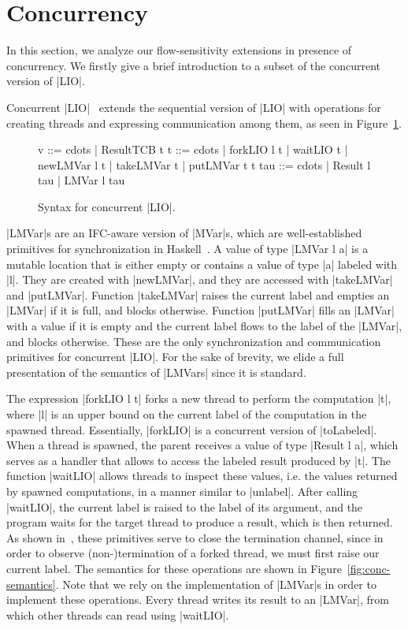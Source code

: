 \section{Concurrency}

In this section, we analyze our flow-sensitivity extensions in presence of
concurrency. We firstly give a brief introduction to a subset of the concurrent
version of |LIO|.

Concurrent |LIO|~\cite{?} extends the sequential version of |LIO| with
operations for creating threads and expressing communication among
them, as seen in Figure~\ref{fig:conc-syntax}.
\begin{figure}[ht] %
\small
\begin{code}
v    ::= cdots  | ResultTCB t 
t    ::= cdots  | forkLIO l t | waitLIO t
                | newLMVar l t | takeLMVar t | putLMVar t t
tau  ::= cdots  | Result l tau | LMVar l tau
\end{code}
\caption{Syntax for concurrent |LIO|.\label{fig:conc-syntax}}
\end{figure}

|LMVar|s are an IFC-aware version of |MVar|s, which are
well-established primitives for synchronization in
Haskell~\cite{CH96}.  A value of type |LMVar l a| is a mutable
location that is either empty or contains a value of type |a| labeled
with |l|. They are created with |newLMVar|, and they are accessed with
|takeLMVar| and |putLMVar|. Function |takeLMVar| raises the current
label and empties an |LMVar| if it is full, and blocks
otherwise. Function |putLMVar| fills an |LMVar| with a value if it is
empty and the current label flows to the label of the |LMVar|, and
blocks otherwise. These are the only synchronization and communication
primitives for concurrent |LIO|. For the sake of brevity, we elide a
full presentation of the semantics of |LMVars| since it is standard.

The expression |forkLIO l t| forks a new thread to perform the
computation |t|, where |l| is an upper bound on the current label of
the computation in the spawned thread. Essentially, |forkLIO| is a
concurrent version of |toLabeled|. When a thread is spawned, the
parent receives a value of type |Result l a|, which serves as a
handler that allows to access the labeled result produced by |t|. The
function |waitLIO| allows threads to inspect these values, i.e. the
values returned by spawned computations, in a manner similar to
|unlabel|. After calling |waitLIO|, the current label is raised to the
label of its argument, and the program waits for the target thread to
produce a result, which is then returned. As shown in~\cite{?}, these
primitives serve to close the termination channel, since in order to
observe (non-)termination of a forked thread, we must first raise our
current label. The semantics for these operations are shown in
Figure~\ref{fig:conc-semantics}. Note that we rely on the
implementation of |LMVar|s in order to implement these
operations. Every thread writes its result to an |LMVar|, from which
other threads can read using |waitLIO|.


